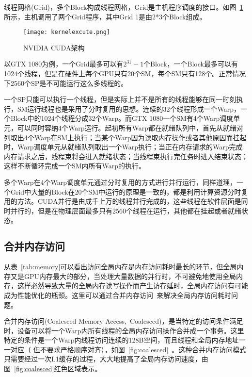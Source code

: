 线程网格(Grid)，多个Block构成线程网格，Grid是主机程序调度的接口。如图~\ref{fig:nvidia-cuda-arch}所示，主机调用了两个Grid程序，其中Grid 1是由2*3个Block组成。

\begin{figure}[H] %
	\centering
	\texttt{[image: kernelexcute.png]}
	\caption{NVIDIA CUDA架构}
	\label{fig:nvidia-cuda-arch}
\end{figure}

以GTX 1080为例，一个Grid最多可以有$2^{31}-1$个Block，一个Block最多可以有1024个线程，但是在硬件上每个GPU只有20个SM，每个SM只有128个。正常情况下2560个SP是不可能运行这么多线程的。

一个SP只能可以执行一个线程，但是实际上并不是所有的线程能够在同一时刻执行，SM运行线程也是采用了分时复用的思想。连续的32个线程形成一个Warp，一个Block中的1024个线程分成32个Warp。而GTX 1080一个SM有4个Warp调度单元，可以同时容纳4个Warp运行。起初所有Warp都在就绪队列中，首先从就绪对列取出4个Warp在SM上执行；当某个Warp因为读取内存操作或者其他原因而挂起时，Warp调度单元从就绪队列取出一个Warp执行；当正在内存请求的Warp完成内存请求之后，线程束将会进入就绪状态；当线程束执行完任务时进入结束状态；这样不断循环完成一个SM内所有Warp的执行。

多个Warp在4个Warp调度单元通过分时复用的方式进行并行运行，同样道理，一个Grid中大量的Block在20个SM中运行的原理是一致的，都是利用计算资源分时复用的方法。CUDA并行是由成千上万的线程并行完成的，这些线程在软件层面是同时并行的，但是在物理层面最多只有2560个线程在运行，其他都在挂起或者就绪状态。

\subsection{合并内存访问}
\label{cha:chap02:coalesced}

从表~\ref{tab:memory}可以看出访问全局内存是内存访问耗时最长的环节，但全局内存又是GPU内存最大的部分，当处理大量数据的并行时，不可避免地使用全局内存，这样必然导致大量的全局内存读写操作而产生访存延时，全局内存访问有可能成为性能优化的瓶颈。这里可以通过合并内存访问~\cite{nvidia2012c}来解决全局内存访问耗时问题。

合并内存访问(Coalesced Memory Access,~Coalesced)，是当特定的访问条件满足时，设备可以将一个Warp内所有线程的全局内存访问操作合并成一个事务。这里特定的条件是一个Warp内线程访问连续的128B空间，而且线程和全局内存地址一一对应（ 但不要求严格顺序对齐），如图~\ref{fig:coalesced}~\cite{woolley2013gpu}。这种合并内存访问模式只需要经过一次L1缓存的过程，大大地提高了全局内存访问速度，由图~\ref{fig:coalesced}红色区域表示。

